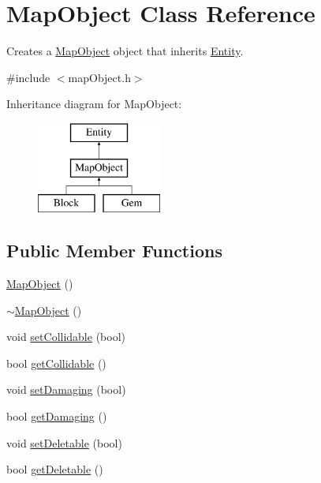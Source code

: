 \hypertarget{class_map_object}{\section{Map\+Object Class Reference}
\label{class_map_object}
}


Creates a \hyperlink{class_map_object}{Map\+Object} object that inherits \hyperlink{class_entity}{Entity}.  




{\ttfamily \#include $<$map\+Object.\+h$>$}

Inheritance diagram for Map\+Object\+:\begin{figure}[H]
\begin{center}
\leavevmode
\includegraphics[height=3.000000cm]{class_map_object}
\end{center}
\end{figure}
\subsection*{Public Member Functions}
\begin{DoxyCompactItemize}
\item 
\hyperlink{class_map_object_a568754515cc72ce0861d30c3040d26d2}{Map\+Object} ()
\item 
\hyperlink{class_map_object_aa601344267a49df197e841fcbd732209}{$\sim$\+Map\+Object} ()
\item 
void \hyperlink{class_map_object_afc35a1271fdb83198e239a548b26337e}{set\+Collidable} (bool)
\item 
bool \hyperlink{class_map_object_a5c940048e408308c71b57a78444d155d}{get\+Collidable} ()
\item 
void \hyperlink{class_map_object_abcf8499f40944338e194abcbd3294852}{set\+Damaging} (bool)
\item 
bool \hyperlink{class_map_object_acaa0fff07bd2550c1f023ca90e2a4b04}{get\+Damaging} ()
\item 
void \hyperlink{class_map_object_af14721fd27162d9fd0f04f69d8087811}{set\+Deletable} (bool)
\item 
bool \hyperlink{class_map_object_a739bba3a3a50a84bf5e6244d19152a38}{get\+Deletable} ()
\end{DoxyCompactItemize}
